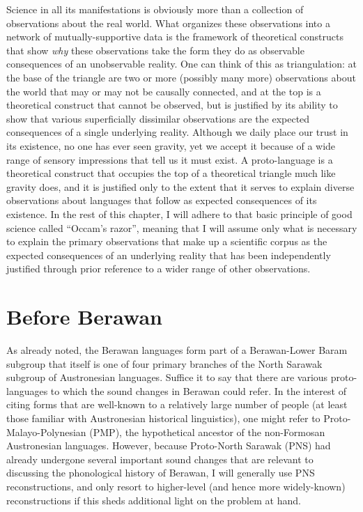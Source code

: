 \documentclass[output=paper]{langscibook}
\begin{document}
Science in all its manifestations is obviously more than a collection of observations about the real world. What organizes these observations into a network of mutually-supportive data is the framework of theoretical constructs that show \textit{why} these observations take the form they do as observable consequences of an unobservable reality. One can think of this as triangulation: at the base of the triangle are two or more (possibly many more) observations about the world that may or may not be causally connected, and at the top is a theoretical construct that cannot be observed, but is justified by its ability to show that various superficially dissimilar observations are the expected consequences of a single underlying reality. Although we daily place our trust in its existence, no one has ever seen gravity, yet we accept it because of a wide range of sensory impressions that tell us it must exist. A proto-language is a theoretical construct that occupies the top of a theoretical triangle much like gravity does, and it is justified only to the extent that it serves to explain diverse observations about languages that follow as expected consequences of its existence. In the rest of this chapter, I will adhere to that basic principle of good science called “Occam’s razor”, meaning that I will assume only what is necessary to explain the primary observations that make up a scientific corpus as the expected consequences of an underlying reality that has been independently justified through prior reference to a wider range of other observations.

\section{Before Berawan}\label{sec:Before-Berewan}
  As already noted, the Berawan languages form part of a Berawan-Lower Baram subgroup that itself is one of four primary branches of the North Sarawak subgroup of Austronesian languages. Suffice it to say that there are various proto-languages to which the sound changes in Berawan could refer. In the interest of citing forms that are well-known to a relatively large number of people (at least those familiar with Austronesian historical linguistics), one might refer to Proto-Malayo-Polynesian (PMP), the hypothetical ancestor of the non-Formosan Austronesian languages. However, because Proto-North Sarawak (PNS) had already undergone several important sound changes that are relevant to discussing the phonological history of Berawan, I will generally use PNS reconstructions, and only resort to higher-level (and hence more widely-known) reconstructions if this sheds additional light on the problem at hand.
\end{document}

